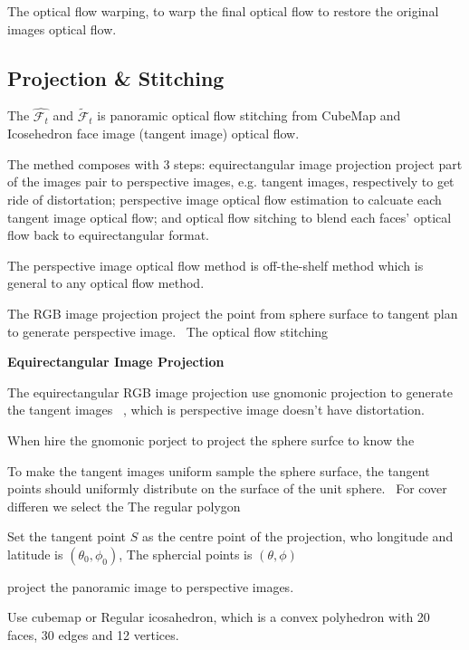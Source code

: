 The optical flow warping, to warp the final optical flow to restore the original images optical flow.


\subsection{Projection \& Stitching}\label{sec:approach:projstit}


The $\hat{\mathcal{F}_t}$ and $\tilde{\mathcal{F}}_t$ is panoramic optical flow stitching from CubeMap and Icosehedron face image (tangent image) optical flow.

The methed composes with 3 steps:
 equirectangular image projection project part of the images pair to perspective images, e.g. tangent images, respectively to get ride of distortation;
 perspective image optical flow estimation to calcuate each tangent image optical flow;
 and optical flow sitching to blend each faces' optical flow back to equirectangular format. 
 
 The perspective image optical flow method is off-the-shelf method which is general to any optical flow method.

The RGB image projection project the point from sphere surface to tangent plan to generate perspective image.~\cite{??}
The optical flow stitching 

\textbf{Equirectangular Image Projection}


The equirectangular RGB image projection use gnomonic projection to generate the tangent images ~\cite{??}, which is perspective image doesn't have distortation.

When hire the gnomonic porject to project the sphere surfce to know the 

To make the tangent images uniform sample the sphere surface, the tangent points should uniformly distribute on the surface of the unit sphere.~\cite{??}
For cover differen we select the 
The regular polygon ~\cite{??} 


Set the tangent point $S$ as the centre point of the projection, who longitude and latitude is $(\theta_0, \phi_0)$,
The sphercial points is $(\theta, \phi)$

project the panoramic image to perspective images.

Use cubemap or Regular icosahedron, which is a convex polyhedron with 20 faces, 30 edges and 12 vertices.


